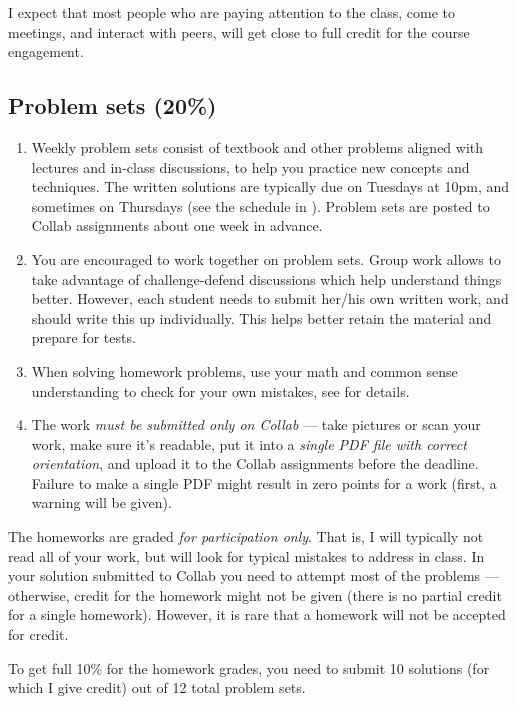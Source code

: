 \documentclass[oneside,11pt]{amsart}
\begin{document}
I expect that most people who are paying attention to the class,
come to meetings, and interact with peers, will get close to full credit for
the course engagement.

\subsection{Problem sets (20\%)}

\begin{enumerate}[$\bullet$]
	\item Weekly problem sets consist of textbook and other problems aligned with 
		lectures and 
		in-class discussions, to
		help you practice new concepts and techniques. 
		The written solutions are typically due on
		Tuesdays at 10pm, and sometimes on Thursdays (see the schedule in ).
		Problem sets are posted to Collab assignments
		about one week in advance.
	\item You are encouraged to work together on problem sets.
		Group work allows to 
		take advantage of challenge-defend discussions which help understand things
		better.
		However, each student needs to submit her/his own written work, 
		and should write this up individually. 
		This helps better retain the material and prepare for tests.
	\item 
		When solving homework problems, use your math and common sense understanding to check for your own mistakes,
		see  for details.
	\item 
		The work \emph{must be submitted only on Collab} --- 
		take pictures or scan your work,
		make sure it's readable,
		put it into a \emph{single PDF file with correct orientation},
		and upload it to the Collab assignments before the deadline.
		Failure to make a single PDF might result in zero points for a work
		(first, a warning will be given).
\end{enumerate}

The homeworks are graded \emph{for participation only}.
That is, I will typically not read all of your 
work, but will look for typical mistakes to address
in class. 
In your solution submitted to Collab
you need to attempt most of the problems --- otherwise, credit for the homework might
not be given (there is no partial credit for a single homework). However, it is rare that a 
homework will not be accepted for credit.

To get full 10\% for the homework grades, 
you need to submit 10 solutions (for which I give credit)
out of 12 total problem sets.
\end{document}
